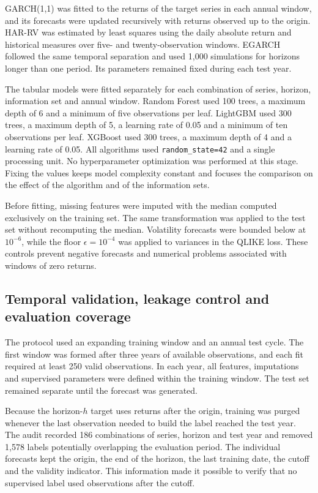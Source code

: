 \documentclass[a4paper,fleqn]{cas-sc}
\begin{document}
GARCH(1,1) was fitted to the returns of the target series in each annual window, and its forecasts were updated recursively with returns observed up to the origin. HAR-RV was estimated by least squares using the daily absolute return and historical measures over five- and twenty-observation windows. EGARCH followed the same temporal separation and used 1,000 simulations for horizons longer than one period. Its parameters remained fixed during each test year.

The tabular models were fitted separately for each combination of series, horizon, information set and annual window. Random Forest used 100 trees, a maximum depth of 6 and a minimum of five observations per leaf. LightGBM used 300 trees, a maximum depth of 5, a learning rate of 0.05 and a minimum of ten observations per leaf. XGBoost used 300 trees, a maximum depth of 4 and a learning rate of 0.05. All algorithms used \texttt{random\_state=42} and a single processing unit. No hyperparameter optimization was performed at this stage. Fixing the values keeps model complexity constant and focuses the comparison on the effect of the algorithm and of the information sets.

Before fitting, missing features were imputed with the median computed exclusively on the training set. The same transformation was applied to the test set without recomputing the median. Volatility forecasts were bounded below at \(10^{-6}\), while the floor \(\epsilon=10^{-4}\) was applied to variances in the QLIKE loss. These controls prevent negative forecasts and numerical problems associated with windows of zero returns.

\subsection{Temporal validation, leakage control and evaluation coverage}
\label{subsec:experimental_validation}

The protocol used an expanding training window and an annual test cycle. The first window was formed after three years of available observations, and each fit required at least 250 valid observations. In each year, all features, imputations and supervised parameters were defined within the training window. The test set remained separate until the forecast was generated.

Because the horizon-\(h\) target uses returns after the origin, training was purged whenever the last observation needed to build the label reached the test year. The audit recorded 186 combinations of series, horizon and test year and removed 1,578 labels potentially overlapping the evaluation period. The individual forecasts kept the origin, the end of the horizon, the last training date, the cutoff and the validity indicator. This information made it possible to verify that no supervised label used observations after the cutoff.
\end{document}
